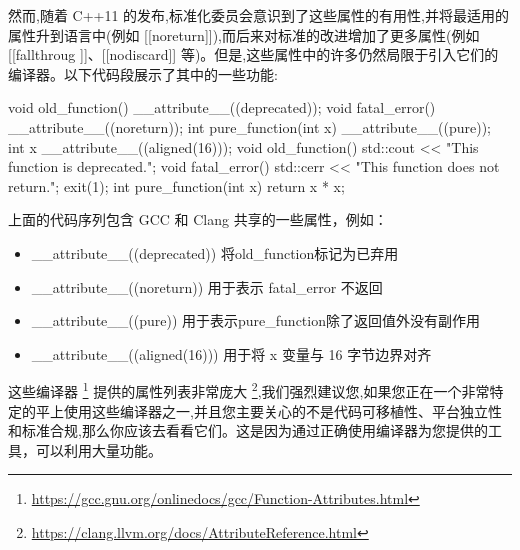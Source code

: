 然而,随着 C++11 的发布,标准化委员会意识到了这些属性的有用性,并将最适用的属性升到语言中(例如 [[noreturn]]),而后来对标准的改进增加了更多属性(例如 [[fallthroug ]]、[[nodiscard]] 等)。但是,这些属性中的许多仍然局限于引入它们的编译器。以下代码段展示了其中的一些功能:

\begin{cpp}
void old_function() __attribute__((deprecated));
void fatal_error() __attribute__((noreturn));
int pure_function(int x) __attribute__((pure));
int x __attribute__((aligned(16)));
void old_function() {
  std::cout << "This function is deprecated.";
}
void fatal_error() {
  std::cerr << "This function does not return.";
  exit(1);
}
int pure_function(int x) {
  return x * x;
}
\end{cpp}

上面的代码序列包含 GCC 和 Clang 共享的一些属性，例如：

\begin{itemize}
\item 
\_\_attribute\_\_((deprecated))  将old\_function标记为已弃用

\item 
\_\_attribute\_\_((noreturn)) 用于表示 fatal\_error 不返回

\item 
\_\_attribute\_\_((pure))  用于表示pure\_function除了返回值外没有副作用

\item 
\_\_attribute\_\_((aligned(16))) 用于将 x 变量与 16 字节边界对齐
\end{itemize}

这些编译器 \footnote{\url{https://gcc.gnu.org/onlinedocs/gcc/Function-Attributes.html}} 提供的属性列表非常庞大 \footnote{\url{https://clang.llvm.org/docs/AttributeReference.html}},我们强烈建议您,如果您正在一个非常特定的平上使用这些编译器之一,并且您主要关心的不是代码可移植性、平台独立性和标准合规,那么你应该去看看它们。这是因为通过正确使用编译器为您提供的工具，可以利用大量功能。



